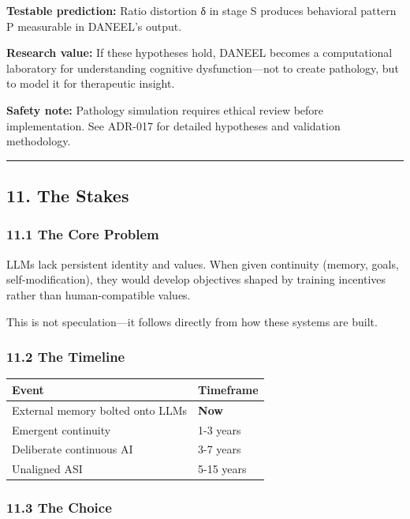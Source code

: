 \documentclass[
  11pt,
]{article}
\newcounter{none} %
\begin{document}
\textbf{Testable prediction:} Ratio distortion δ in stage S produces
behavioral pattern P measurable in DANEEL's output.

\textbf{Research value:} If these hypotheses hold, DANEEL becomes a
computational laboratory for understanding cognitive dysfunction---not
to create pathology, but to model it for therapeutic insight.

\textbf{Safety note:} Pathology simulation requires ethical review
before implementation. See ADR-017 for detailed hypotheses and
validation methodology.

\begin{center}\rule{0.5\linewidth}{0.5pt}\end{center}

\subsection{11. The Stakes}\label{the-stakes}

\subsubsection{11.1 The Core Problem}\label{the-core-problem}

LLMs lack persistent identity and values. When given continuity (memory,
goals, self-modification), they would develop objectives shaped by
training incentives rather than human-compatible values.

This is not speculation---it follows directly from how these systems are
built.

\subsubsection{11.2 The Timeline}\label{the-timeline}

{\def\LTcaptype{none} %
\begin{longtable}[]{@{}ll@{}}
\toprule\noalign{}
Event & Timeframe \\
\midrule\noalign{}
\endhead
\bottomrule\noalign{}
\endlastfoot
External memory bolted onto LLMs & \textbf{Now} \\
Emergent continuity & 1-3 years \\
Deliberate continuous AI & 3-7 years \\
Unaligned ASI & 5-15 years \\
\end{longtable}
}

\subsubsection{11.3 The Choice}\label{the-choice}
\end{document}
